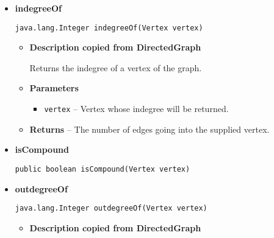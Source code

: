 {{{{{{{{{{{{{{{{\begin{itemize}
{\begin{itemize}
{Returns a set of all incoming edges of a vertex.
}
\item{
{\bf  Parameters}
  \begin{itemize}
   \item{
\texttt{vertex} -- Vertex whose incoming edges will be returned.}
  \end{itemize}
}%
\item{{\bf  Returns} -- 
The edges coming in the supplied vertex. 
}%
\end{itemize}
}%
\item{ 
{\bf  indegreeOf}\\
\begin{lstlisting}[frame=none]
java.lang.Integer indegreeOf(Vertex vertex)\end{lstlisting} %
\begin{itemize}
\item{
{\bf  Description copied from DirectedGraph{\small {}} }

Returns the indegree of a vertex of the graph.
}
\item{
{\bf  Parameters}
  \begin{itemize}
   \item{
\texttt{vertex} -- Vertex whose indegree will be returned.}
  \end{itemize}
}%
\item{{\bf  Returns} -- 
The number of edges going into the supplied vertex. 
}%
\end{itemize}
}%
\item{ 
{\bf  isCompound}\\
\begin{lstlisting}[frame=none]
public boolean isCompound(Vertex vertex)\end{lstlisting} %
}%
\item{ 
{\bf  outdegreeOf}\\
\begin{lstlisting}[frame=none]
java.lang.Integer outdegreeOf(Vertex vertex)\end{lstlisting} %
\begin{itemize}
\item{
{\bf  Description copied from DirectedGraph{\small {}} }

}
\end{itemize}}
\end{itemize}}}}}}}}}}}}}}}}}
